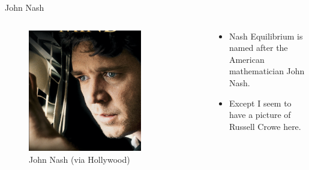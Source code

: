 \documentclass[
  14pt,
  letterpaper,
  ignorenonframetext,
  aspectratio=169,
  handout]{beamer}
\providecommand{\tightlist}{%
  \setlength{\itemsep}{0pt}\setlength{\parskip}{0pt}}\usepackage{longtable,booktabs,array}
\let\olditem\item
\renewcommand{\item}{%
\olditem\vspace{6pt}}
\begin{document}
\begin{frame}{John Nash}
\protect\hypertarget{john-nash}{}
\begin{columns}[c]
\begin{column}{0.48\textwidth}
\begin{figure}

{\centering \includegraphics[width=0.75\textwidth,height=0.75\textheight]{images/crowe.png}

}

\caption{John Nash (via Hollywood)}

\end{figure}
\end{column}

\begin{column}{0.48\textwidth}
\begin{itemize}[<+->]
\tightlist
\item
  Nash Equilibrium is named after the American mathematician John Nash.
\item
  Except I seem to have a picture of Russell Crowe here.
\end{itemize}
\end{column}
\end{columns}
\end{frame}
\end{document}
